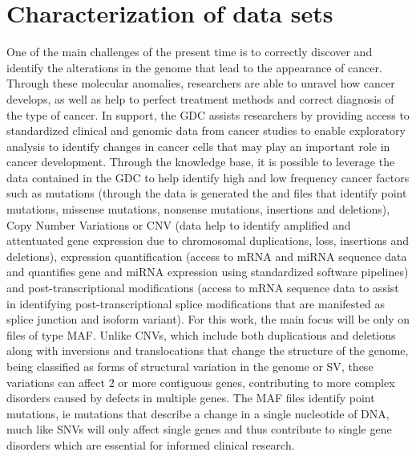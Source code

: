 
\chapter{Characterization of data sets}
\label{cha:general_characterization}

\hspace{10px} One of the main challenges of the present time is to correctly discover and identify the alterations in the genome that lead to the appearance of cancer. Through these molecular anomalies, researchers are able to unravel how cancer develops, as well as help to perfect treatment methods and correct diagnosis of the type of cancer. In support, the GDC assists researchers by providing access to standardized clinical and genomic data from cancer studies to enable exploratory analysis to identify changes in cancer cells that may play an important role in cancer development. Through the  knowledge base, it is possible to leverage the data contained in the GDC to help identify high and low frequency cancer factors such as mutations (through the data is generated the  and  files that identify point mutations, missense mutations, nonsense mutations, insertions and deletions), Copy Number Variations or CNV (data help to identify amplified and attentuated gene expression due to chromosomal duplications, loss, insertions and deletions), expression quantification (access to mRNA and miRNA sequence data and quantifies gene and miRNA expression using standardized software pipelines) and post-transcriptional modifications (access to mRNA sequence data to assist in identifying post-transcriptional splice modifications that are manifested as splice junction and isoform variant). For this work, the main focus will be only on files of type MAF. Unlike CNVs, which include both duplications and deletions along with inversions and translocations that change the structure of the genome, being classified as forms of structural variation in the genome or \gls{SV}, these variations can affect 2 or more contiguous genes, contributing to more complex disorders caused by defects in multiple genes\cite{Rebecca}. The MAF files identify point mutations, ie mutations that describe a change in a single nucleotide of DNA, much like SNVs will only affect single genes and thus contribute to single gene disorders which are essential for informed clinical research.





